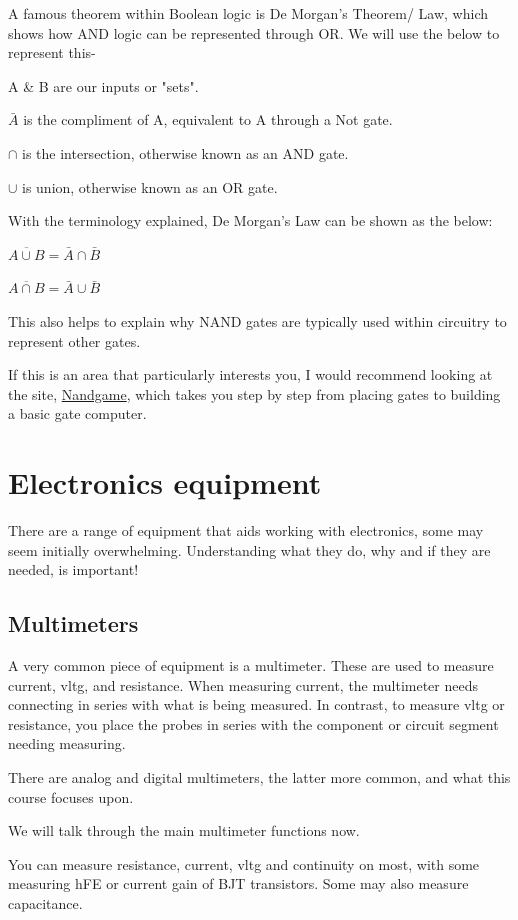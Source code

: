 \documentclass[a4paper,11pt]{report}
\begin{document}
A famous theorem within Boolean logic is De Morgan's Theorem/ Law, which shows how AND logic can be represented through OR. We will use the below to represent this-

A \& B are our inputs or "sets".

$\bar{A}$ is the compliment of A, equivalent to A through a Not gate.

$\cap$ is the intersection, otherwise known as an AND gate.

$\cup$ is union, otherwise known as an OR gate.

With the terminology explained, De Morgan's Law can be shown as the below:

$\overline{A\cup B} = \bar{A}\cap\bar{B}$

$\overline{A\cap B} = \bar{A}\cup\bar{B}$

This also helps to explain why NAND gates are typically used within circuitry to represent other gates.

If this is an area that particularly interests you, I would recommend looking at the site, \href{https://nandgame.com/}{Nandgame}, which takes you step by step from placing gates to building a basic gate computer.

\section{Electronics equipment}

There are a range of equipment that aids working with electronics, some may seem initially overwhelming. Understanding what they do, why and if they are needed, is important!

\subsection{Multimeters}

A very common piece of equipment is a multimeter. These are used to measure current, \gls{vltg}, and resistance. When measuring current, the multimeter needs connecting in series with what is being measured. In contrast, to measure \gls{vltg} or resistance, you place the probes in series with the component or circuit segment needing measuring.

There are analog and digital multimeters, the latter more common, and what this course focuses upon.

We will talk through the main multimeter functions now.

You can measure resistance, current, \gls{vltg} and continuity on most, with some measuring hFE or current gain of BJT transistors. Some may also measure capacitance.
\end{document}
